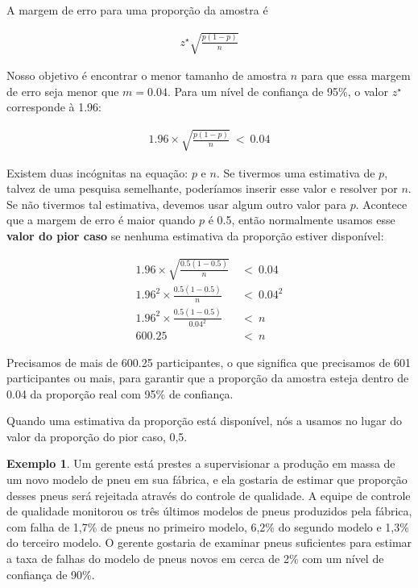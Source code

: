 \documentclass[
]{book}
\theoremstyle{definition}
\theoremstyle{definition}
\newtheorem{example}{Exemplo}[chapter]
\theoremstyle{definition}
\theoremstyle{definition}
\theoremstyle{remark}
\begin{document}
A margem de erro para uma proporção da amostra é

\begin{align*}
z^{\star} \sqrt{\frac{p (1 - p)}{n}}
\end{align*}

Nosso objetivo é encontrar o menor tamanho de amostra \(n\) para que essa margem de erro seja menor que \(m = 0.04\). Para um nível de confiança de 95\%, o valor \(z^{\star}\) corresponde à 1.96:

\begin{align*}
1.96\times \sqrt{\frac{p(1-p)}{n}} \ < \ 0.04
\end{align*}

Existem duas incógnitas na equação: \(p\) e \(n\). Se tivermos uma estimativa de \(p\), talvez de uma pesquisa semelhante, poderíamos inserir esse valor e resolver por \(n\). Se não tivermos tal estimativa, devemos usar algum outro valor para \(p\). Acontece que a margem de erro é maior quando \(p\) é 0.5, então normalmente usamos esse \textbf{valor do pior caso} se nenhuma estimativa da proporção estiver disponível:

\begin{align*}
    1.96\times \sqrt{\frac{0.5(1-0.5)}{n}} &\ < \ 0.04 \\
    1.96^2\times \frac{0.5(1-0.5)}{n} &\ < \ 0.04^2 \\
    1.96^2\times \frac{0.5(1-0.5)}{0.04^2} &\ < \ n \\
    600.25 &\ < \  n
\end{align*}

Precisamos de mais de 600.25 participantes, o que significa que precisamos de 601 participantes ou mais, para garantir que a proporção da amostra esteja dentro de 0.04 da proporção real com 95\% de confiança.

Quando uma estimativa da proporção está disponível, nós a usamos no lugar do valor da proporção do pior caso, 0,5.

\begin{example}
\protect\hypertarget{exm:unnamed-chunk-229}{}{\label{exm:unnamed-chunk-229} }Um gerente está prestes a supervisionar a produção em massa de um novo modelo de pneu em sua fábrica, e ela gostaria de estimar que proporção desses pneus será rejeitada através do controle de qualidade. A equipe de controle de qualidade monitorou os três últimos modelos de pneus produzidos pela fábrica, com falha de 1,7\% de pneus no primeiro modelo, 6,2\% do segundo modelo e 1,3\% do terceiro modelo. O gerente gostaria de examinar pneus suficientes para estimar a taxa de falhas do modelo de pneus novos em cerca de 2\% com um nível de confiança de 90\%.
\end{example}
\end{document}
